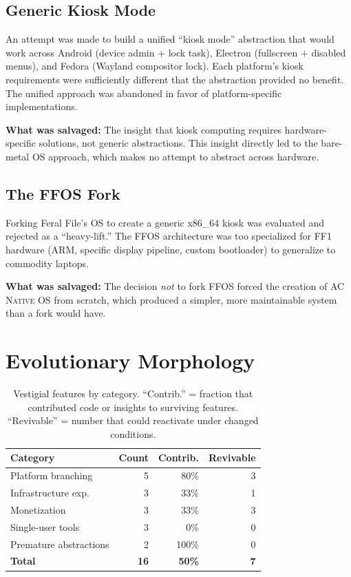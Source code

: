 \documentclass[10pt,letterpaper,twocolumn]{article}
\newcommand{\acos}{\textsc{AC Native OS}}
\begin{document}
\subsection{Generic Kiosk Mode}

An attempt was made to build a unified ``kiosk mode'' abstraction that would work across Android (device admin + lock task), Electron (fullscreen + disabled menus), and Fedora (Wayland compositor lock). Each platform's kiosk requirements were sufficiently different that the abstraction provided no benefit. The unified approach was abandoned in favor of platform-specific implementations.

\textbf{What was salvaged:} The insight that kiosk computing requires hardware-specific solutions, not generic abstractions. This insight directly led to the bare-metal OS approach, which makes no attempt to abstract across hardware.

\subsection{The FFOS Fork}

Forking Feral File's OS to create a generic x86\_64 kiosk was evaluated and rejected as a ``heavy-lift.'' The FFOS architecture was too specialized for FF1 hardware (ARM, specific display pipeline, custom bootloader) to generalize to commodity laptops.

\textbf{What was salvaged:} The decision \emph{not} to fork FFOS forced the creation of \acos{} from scratch, which produced a simpler, more maintainable system than a fork would have.

\section{Evolutionary Morphology}

\begin{table}[h]
\small
\centering
\begin{tabularx}{\columnwidth}{Xrrr}
\toprule
\textbf{Category} & \textbf{Count} & \textbf{Contrib.} & \textbf{Revivable} \\
\midrule
Platform branching & 5 & 80\% & 3 \\
Infrastructure exp. & 3 & 33\% & 1 \\
Monetization & 3 & 33\% & 3 \\
Single-user tools & 3 & 0\% & 0 \\
Premature abstractions & 2 & 100\% & 0 \\
\midrule
\textbf{Total} & \textbf{16} & \textbf{50\%} & \textbf{7} \\
\bottomrule
\end{tabularx}
\caption{Vestigial features by category. ``Contrib.'' = fraction that contributed code or insights to surviving features. ``Revivable'' = number that could reactivate under changed conditions.}
\label{tab:vestigial}
\end{table}
\end{document}
